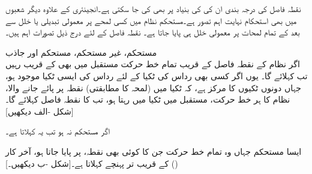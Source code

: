 نقطہ فاصل کی درجہ بندی ان کی  کی بنیاد پر بھی کی جا سکتی ہے۔انجینئری کے علاوہ دیگر شعبوں میں بھی  استحکام نہایت اہم تصور ہے۔مستحکم نظام میں کسی لمحے پر معمولی تبدیلی یا خلل سے بعد کے تمام لمحات پر معمولی خلل ہی پایا جاتا ہے۔ نقطہ فاصل کے لئے درج ذیل تصورات اہم ہیں۔

\quad مستحکم، غیر مستحکم، مستحکم اور جاذب\\
اگر نظام  کے نقطہ فاصل  کے قریب تمام خط حرکت مستقبل میں بھی  کے قریب رہیں تب    کہلائے گا۔ یوں اگر کسی بھی رداس  کی ٹکیا  کے لئے  رداس  کی ایسی ٹکیا  موجود ہو،  جہاں دونوں ٹکیوں کا مرکز  ہے، کہ  ٹکیا  میں (لمحہ  کا مطابقتی) نقطہ  پر  پائے جانے والا، نظام  کا ہر خط حرکت، مستقبل میں ٹکیا  میں رہتا ہو، تب  کا نقطہ فاصل  کہلائے گا۔[شکل -الف دیکھیں]

اگر  مستحکم نہ ہو تب یہ  کہلاتا ہے۔ 

ایسا مستحکم  جہاں وہ تمام خط حرکت جن کا کوئی بھی نقطہ،  پر پایا جاتا ہو، آخر کار ()  کے قریب تر پہنچے   کہلاتا ہے۔[شکل -ب دیکھیں۔]

